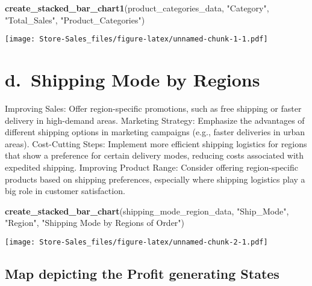 \documentclass[
]{article}
\newenvironment{Shaded}{\begin{snugshade}}{\end{snugshade}}
\newcommand{\FunctionTok}[1]{\textcolor[rgb]{0.13,0.29,0.53}{\textbf{#1}}}
\newcommand{\NormalTok}[1]{#1}
\newcommand{\StringTok}[1]{\textcolor[rgb]{0.31,0.60,0.02}{#1}}
\begin{document}
\begin{Shaded}
\begin{Highlighting}[]
\FunctionTok{create\_stacked\_bar\_chart1}\NormalTok{(product\_categories\_data, }\StringTok{"Category"}\NormalTok{, }\StringTok{"Total\_Sales"}\NormalTok{, }\StringTok{"Product\_Categories"}\NormalTok{)}
\end{Highlighting}
\end{Shaded}

\texttt{[image: Store-Sales\_files/figure-latex/unnamed-chunk-1-1.pdf]}

\hypertarget{d.-shipping-mode-by-regions}{%
\section{d.~Shipping Mode by
Regions}\label{d.-shipping-mode-by-regions}}

Improving Sales: Offer region-specific promotions, such as free shipping
or faster delivery in high-demand areas. Marketing Strategy: Emphasize
the advantages of different shipping options in marketing campaigns
(e.g., faster deliveries in urban areas). Cost-Cutting Steps: Implement
more efficient shipping logistics for regions that show a preference for
certain delivery modes, reducing costs associated with expedited
shipping. Improving Product Range: Consider offering region-specific
products based on shipping preferences, especially where shipping
logistics play a big role in customer satisfaction.

\begin{Shaded}
\begin{Highlighting}[]
\FunctionTok{create\_stacked\_bar\_chart}\NormalTok{(shipping\_mode\_region\_data, }\StringTok{"Ship\_Mode"}\NormalTok{, }\StringTok{"Region"}\NormalTok{, }\StringTok{"Shipping Mode by Regions of Order"}\NormalTok{)}
\end{Highlighting}
\end{Shaded}

\texttt{[image: Store-Sales\_files/figure-latex/unnamed-chunk-2-1.pdf]}

\hypertarget{map-depicting-the-profit-generating-states}{%
\subsection{Map depicting the Profit generating
States}\label{map-depicting-the-profit-generating-states}}
\end{document}
